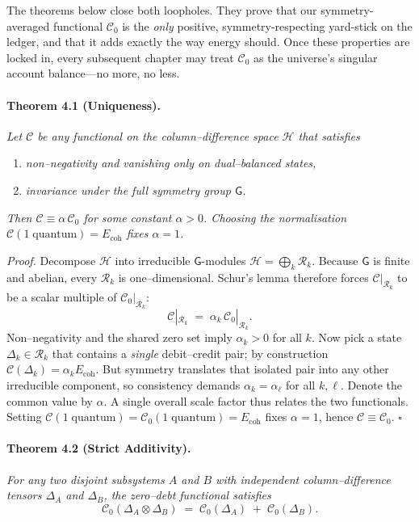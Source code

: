\documentclass[11pt]{article}
\begin{document}
The theorems below close both loopholes.  
They prove that our symmetry-averaged functional \(\mathcal{C}_{0}\) is the \emph{only} positive, symmetry-respecting yard-stick on the ledger, and that it adds exactly the way energy should.  
Once these properties are locked in, every subsequent chapter may treat \(\mathcal{C}_{0}\) as the universe’s singular account balance—no more, no less.


\paragraph{Theorem 4.1 (Uniqueness).}
\emph{Let \(\mathcal{C}\) be any functional on the column–difference space \(\mathcal{H}\) that satisfies}
\begin{enumerate}
  \item \emph{non–negativity and vanishing only on dual–balanced states,}
  \item \emph{invariance under the full symmetry group \(\mathsf{G}\).}
\end{enumerate}
\emph{Then \(\mathcal{C}\equiv\alpha\,\mathcal{C}_{0}\) for some constant \(\alpha>0\).  Choosing the normalisation \(\mathcal{C}(1\;\text{quantum})=E_{\text{coh}}\) fixes \(\alpha=1\).}

\medskip
\textit{Proof.}
Decompose \(\mathcal{H}\) into irreducible \(\mathsf{G}\)-modules
\(\mathcal{H}=\bigoplus_{k}\mathcal{R}_{k}\).
Because \(\mathsf{G}\) is finite and abelian, every \(\mathcal{R}_{k}\)
is one–dimensional.  Schur’s lemma therefore forces
\(\mathcal{C}|_{\mathcal{R}_{k}}\) to be a scalar multiple of
\(\mathcal{C}_{0}|_{\mathcal{R}_{k}}\):
\[
\mathcal{C}|_{\mathcal{R}_{k}}
\;=\;
\alpha_{k}\,\mathcal{C}_{0}|_{\mathcal{R}_{k}}.
\]
Non–negativity and the shared zero set imply \(\alpha_{k}>0\) for all
\(k\).  Now pick a state \(\Delta_{k}\in\mathcal{R}_{k}\) that contains a
\emph{single} debit–credit pair; by construction
\(\mathcal{C}(\Delta_{k}) = \alpha_{k}E_{\text{coh}}\).
But symmetry translates that isolated pair into any other irreducible
component, so consistency demands \(\alpha_{k}=\alpha_{\ell}\) for all
\(k,\ell\).  Denote the common value by \(\alpha\).  A single overall
scale factor thus relates the two functionals.  Setting
\(\mathcal{C}(1\;\text{quantum}) = \mathcal{C}_{0}(1\;\text{quantum}) =
E_{\text{coh}}\) fixes \(\alpha=1\), hence \(\mathcal{C}\equiv
\mathcal{C}_{0}\).  \(\square\)

\medskip
\paragraph{Theorem 4.2 (Strict Additivity).}
\emph{For any two disjoint subsystems \(A\) and \(B\) with independent
column–difference tensors \(\Delta_{A}\) and \(\Delta_{B}\), the
zero–debt functional satisfies}
\[
\mathcal{C}_{0}(\Delta_{A}\otimes\Delta_{B})
\;=\;
\mathcal{C}_{0}(\Delta_{A})\;+\;\mathcal{C}_{0}(\Delta_{B}).
\]
\end{document}
